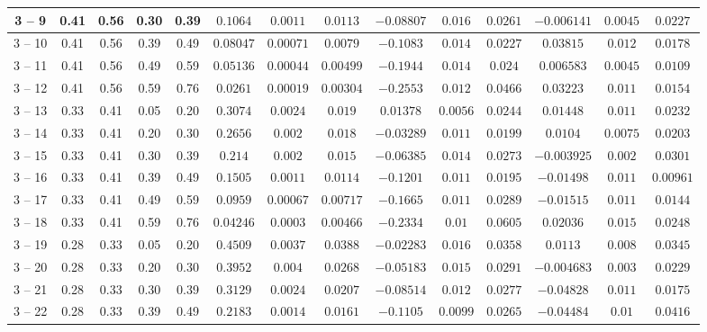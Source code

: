\begin{longtable}{|*{14}{c|}}
\hline
3 -- 9 & 0.41 & 0.56 & 0.30 & 0.39 & $0.1064$ & $0.0011$ & $0.0113$ & $-0.08807$ & $0.016$ & $0.0261$ & $-0.006141$ & $0.0045$ & $0.0227$ \\
\hline
3 -- 10 & 0.41 & 0.56 & 0.39 & 0.49 & $0.08047$ & $0.00071$ & $0.0079$ & $-0.1083$ & $0.014$ & $0.0227$ & $0.03815$ & $0.012$ & $0.0178$ \\
\hline
3 -- 11 & 0.41 & 0.56 & 0.49 & 0.59 & $0.05136$ & $0.00044$ & $0.00499$ & $-0.1944$ & $0.014$ & $0.024$ & $0.006583$ & $0.0045$ & $0.0109$ \\
\hline
3 -- 12 & 0.41 & 0.56 & 0.59 & 0.76 & $0.0261$ & $0.00019$ & $0.00304$ & $-0.2553$ & $0.012$ & $0.0466$ & $0.03223$ & $0.011$ & $0.0154$ \\
\hline
3 -- 13 & 0.33 & 0.41 & 0.05 & 0.20 & $0.3074$ & $0.0024$ & $0.019$ & $0.01378$ & $0.0056$ & $0.0244$ & $0.01448$ & $0.011$ & $0.0232$ \\
\hline
3 -- 14 & 0.33 & 0.41 & 0.20 & 0.30 & $0.2656$ & $0.002$ & $0.018$ & $-0.03289$ & $0.011$ & $0.0199$ & $0.0104$ & $0.0075$ & $0.0203$ \\
\hline
3 -- 15 & 0.33 & 0.41 & 0.30 & 0.39 & $0.214$ & $0.002$ & $0.015$ & $-0.06385$ & $0.014$ & $0.0273$ & $-0.003925$ & $0.002$ & $0.0301$ \\
\hline
3 -- 16 & 0.33 & 0.41 & 0.39 & 0.49 & $0.1505$ & $0.0011$ & $0.0114$ & $-0.1201$ & $0.011$ & $0.0195$ & $-0.01498$ & $0.011$ & $0.00961$ \\
\hline
3 -- 17 & 0.33 & 0.41 & 0.49 & 0.59 & $0.0959$ & $0.00067$ & $0.00717$ & $-0.1665$ & $0.011$ & $0.0289$ & $-0.01515$ & $0.011$ & $0.0144$ \\
\hline
3 -- 18 & 0.33 & 0.41 & 0.59 & 0.76 & $0.04246$ & $0.0003$ & $0.00466$ & $-0.2334$ & $0.01$ & $0.0605$ & $0.02036$ & $0.015$ & $0.0248$ \\
\hline
3 -- 19 & 0.28 & 0.33 & 0.05 & 0.20 & $0.4509$ & $0.0037$ & $0.0388$ & $-0.02283$ & $0.016$ & $0.0358$ & $0.0113$ & $0.008$ & $0.0345$ \\
\hline
3 -- 20 & 0.28 & 0.33 & 0.20 & 0.30 & $0.3952$ & $0.004$ & $0.0268$ & $-0.05183$ & $0.015$ & $0.0291$ & $-0.004683$ & $0.003$ & $0.0229$ \\
\hline
3 -- 21 & 0.28 & 0.33 & 0.30 & 0.39 & $0.3129$ & $0.0024$ & $0.0207$ & $-0.08514$ & $0.012$ & $0.0277$ & $-0.04828$ & $0.011$ & $0.0175$ \\
\hline
3 -- 22 & 0.28 & 0.33 & 0.39 & 0.49 & $0.2183$ & $0.0014$ & $0.0161$ & $-0.1105$ & $0.0099$ & $0.0265$ & $-0.04484$ & $0.01$ & $0.0416$ \\

\end{longtable}
